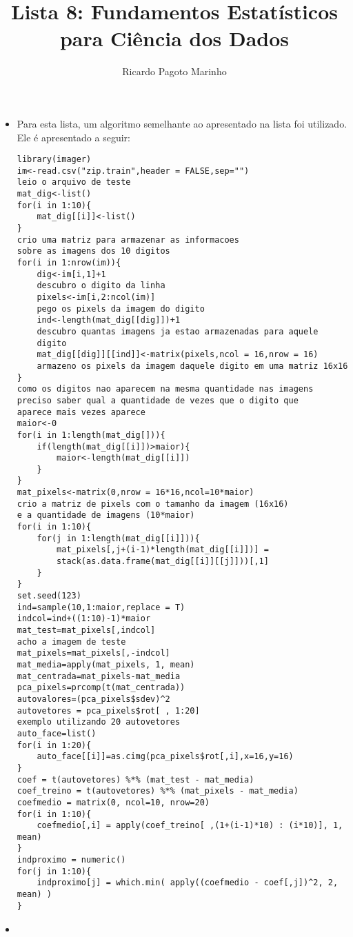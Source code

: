 \documentclass[11pt,a4paper]{book}
\title{Lista 8: Fundamentos Estatísticos para Ciência dos Dados}
\author{Ricardo Pagoto Marinho}
\begin{document}
\maketitle
	\begin{itemize}
		\item
		Para esta lista, um algoritmo semelhante ao apresentado na lista foi utilizado.
		Ele é apresentado a seguir:
		\begin{lstlisting}
library(imager)
im<-read.csv("zip.train",header = FALSE,sep="")
leio o arquivo de teste
mat_dig<-list()
for(i in 1:10){
    mat_dig[[i]]<-list()
}
crio uma matriz para armazenar as informacoes
sobre as imagens dos 10 digitos 
for(i in 1:nrow(im)){
    dig<-im[i,1]+1
    descubro o digito da linha
    pixels<-im[i,2:ncol(im)]
    pego os pixels da imagem do digito
    ind<-length(mat_dig[[dig]])+1
    descubro quantas imagens ja estao armazenadas para aquele
    digito
    mat_dig[[dig]][[ind]]<-matrix(pixels,ncol = 16,nrow = 16)
    armazeno os pixels da imagem daquele digito em uma matriz 16x16
}
como os digitos nao aparecem na mesma quantidade nas imagens
preciso saber qual a quantidade de vezes que o digito que
aparece mais vezes aparece
maior<-0
for(i in 1:length(mat_dig[])){
    if(length(mat_dig[[i]])>maior){
        maior<-length(mat_dig[[i]])
    }
}
mat_pixels<-matrix(0,nrow = 16*16,ncol=10*maior)
crio a matriz de pixels com o tamanho da imagem (16x16)
e a quantidade de imagens (10*maior)
for(i in 1:10){
    for(j in 1:length(mat_dig[[i]])){
        mat_pixels[,j+(i-1)*length(mat_dig[[i]])] = 
        stack(as.data.frame(mat_dig[[i]][[j]]))[,1]
    }
}
set.seed(123)
ind=sample(10,1:maior,replace = T)
indcol=ind+((1:10)-1)*maior
mat_test=mat_pixels[,indcol]
acho a imagem de teste
mat_pixels=mat_pixels[,-indcol]
mat_media=apply(mat_pixels, 1, mean)
mat_centrada=mat_pixels-mat_media
pca_pixels=prcomp(t(mat_centrada))
autovalores=(pca_pixels$sdev)^2
autovetores = pca_pixels$rot[ , 1:20]
exemplo utilizando 20 autovetores
auto_face=list()
for(i in 1:20){
    auto_face[[i]]=as.cimg(pca_pixels$rot[,i],x=16,y=16)
}
coef = t(autovetores) %*% (mat_test - mat_media)
coef_treino = t(autovetores) %*% (mat_pixels - mat_media)
coefmedio = matrix(0, ncol=10, nrow=20)
for(i in 1:10){
    coefmedio[,i] = apply(coef_treino[ ,(1+(i-1)*10) : (i*10)], 1, mean)
}
indproximo = numeric()
for(j in 1:10){
    indproximo[j] = which.min( apply((coefmedio - coef[,j])^2, 2, mean) )
}
		\end{lstlisting}
		\item
		\begin{tabular}{|c|c|c|c|c|c|c|c|c|c|}

\end{tabular}
\end{itemize}
\end{document}
